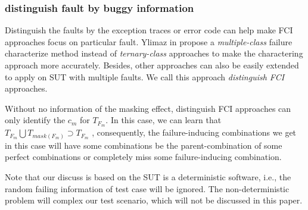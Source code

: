 \documentclass{sig-alternate}
\begin{document}
\subsubsection{distinguish fault by buggy information}
Distinguish the faults by the exception traces or error code can help make FCI approaches focus on particular fault. Ylimaz in  \cite{yilmaz2013reducing} propose a \emph{multiple-class} failure characterize method instead of \emph{ternary-class} approaches to make the charactering approach more accurately. Besides, other approaches can also be easily extended to apply on SUT with multiple faults. We call this approach \emph{distinguish FCI} approaches.

Without no information of the masking effect, distinguish FCI approaches can only identify the $c_{m}$ for $T_{F_{m}}$. In this case, we can learn that $T_{F_{m}} \bigcup T_{mask(F_{m})} \supset T_{F_{m}} $ , consequently, the failure-inducing combinations we get in this case will have some combinations be the parent-combination of some perfect combinations or completely miss some failure-inducing combination.

Note that our discuss is based on the SUT is a deterministic software, i.e., the random failing information of test case will be ignored. The non-deterministic problem will complex our test scenario, which will not be discussed in this paper.
\end{document}
